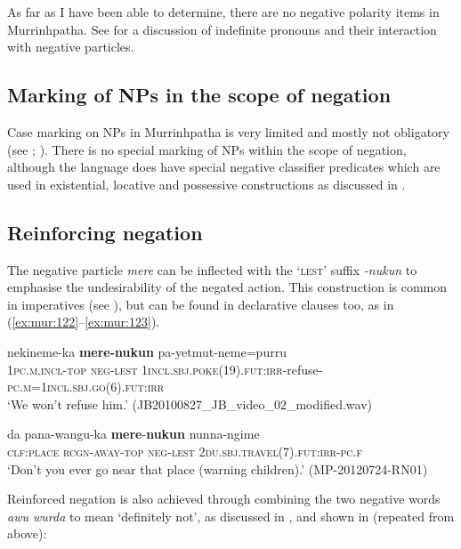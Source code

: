 \documentclass[output=paper,colorlinks,citecolor=brown]{langscibook}
\begin{document}
As far as I have been able to determine, there are no negative polarity items in Murrinhpatha. See  for a discussion of indefinite pronouns and their interaction with negative particles.

\subsection{Marking of NPs in the scope of negation} \label{sec:mur:4.3}

Case marking on NPs in Murrinhpatha is very limited and mostly not obligatory (see \citealt{Nordlinger2015}; \citealt{Mansfield2019}). There is no special marking of NPs within the scope of negation, although the language does have special negative classifier predicates which are used in existential, locative and possessive constructions as discussed in .

\subsection{Reinforcing negation} \label{sec:mur:4.4}

The negative particle \textit{mere} can be inflected with the ‘\textsc{lest}’ suffix \textit{{}-nukun} to emphasise the undesirability of the negated action. This construction is common in imperatives (see ), but can be found in declarative clauses too, as in (\ref{ex:mur:122}--\ref{ex:mur:123}).

\ea\label{ex:mur:122}
    \gll nekineme-ka \textbf{mere-nukun} pa-yetmut-neme=purru\\
         \textsc{1pc.m.incl-top} \textsc{neg-lest} 1\textsc{incl.sbj.poke(19).fut:irr}{}-refuse-\textsc{pc.m=1incl.sbj.go(6).fut:irr}\\
    \glt ‘We won’t refuse him.’ (JB20100827\_JB\_video\_02\_modified.wav)
\z 

\ea\label{ex:mur:123}
    \gll da pana-wangu-ka \textbf{mere}{}-\textbf{nukun} nunna-ngime\\
         \textsc{clf:place} \textsc{rcgn-away-top} \textsc{neg-lest} \textsc{2du.sbj.travel(7).fut:irr-pc.f}\\
    \glt ‘Don’t you ever go near that place (warning children).’ (MP-20120724-RN01)
\z 

Reinforced negation is also achieved through combining the two negative words \textit{awu wurda} to mean ‘definitely not’, as discussed in , and shown in  (repeated from above):
 
\end{document}
